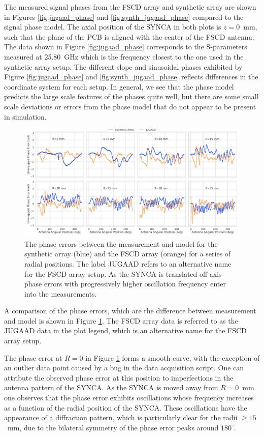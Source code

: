 The measured signal phases from the FSCD array and synthetic array are shown in Figures \ref{fig:jugaad_phase} and \ref{fig:synth_jugaad_phase} compared to the signal phase model. The axial position of the SYNCA in both plots is $z=0$~mm, such that the plane of the PCB is aligned with the center of the FSCD antenna. The data shown in Figure \ref{fig:jugaad_phase} corresponds to the S-parameters measured at 25.80~GHz which is the frequency closest to the one used in the synthetic array setup. The different slope and sinusoidal phases exhibited by Figure \ref{fig:jugaad_phase} and \ref{fig:synth_jugaad_phase} reflects differences in the coordinate system for each setup. In general, we see that the phase model predicts the large scale features of the phases quite well, but there are some small scale deviations or errors from the phase model that do not appear to be present in simulation. 

\begin{figure}[htbp]
    \centering
    \includegraphics[width=1\textwidth]{figs/Chapter-5/230414_synthetic_array_phase_error_curves_z0.png}
    \caption{The phase errors between the measurement and model for the synthetic array (blue) and the FSCD array (orange) for a series of radial positions. The label JUGAAD refers to an alternative name for the FSCD array setup. As the SYNCA is translated off-axis phase errors with progressively higher oscillation frequency enter into the measurements.}
    \label{fig:phase-error-curve-comp}
\end{figure}

A comparison of the phase errors, which are the difference between measurement and model is shown in Figure \ref{fig:phase-error-curve-comp}. The FSCD array data is referred to as the JUGAAD data in the plot legend, which is an alternative name for the FSCD array setup.

The phase error at $R=0$ in Figure \ref{fig:phase-error-curve-comp} forms a smooth curve, with the exception of an outlier data point caused by a bug in the data acquisition script. One can attribute the observed phase error at this position to imperfections in the antenna pattern of the SYNCA. As the SYNCA is moved away from $R=0$~mm one observes that the phase error exhibits oscillations whose frequency increases as a function of the radial position of the SYNCA. These oscillations have the appearance of a diffraction pattern, which is particularly clear for the radii $\geq15$~mm, due to the bilateral symmetry of the phase error peaks around $180^\circ$. 

